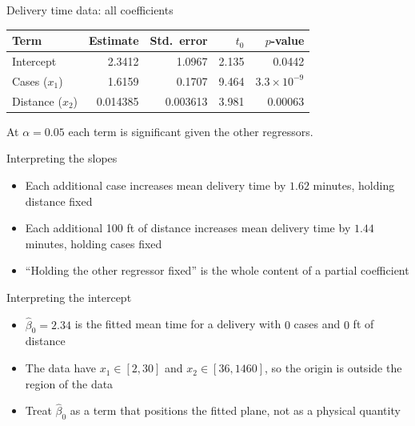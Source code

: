 \begin{frame}{Delivery time data: all coefficients}
    \begin{center}
        \begin{tabular}{lrrrr}
            \toprule
            Term & Estimate & Std.\ error & $t_0$ & $p$-value \\
            \midrule
            Intercept & 2.3412 & 1.0967 & 2.135 & 0.0442 \\
            Cases ($x_1$) & 1.6159 & 0.1707 & 9.464 & $3.3\times 10^{-9}$ \\
            Distance ($x_2$) & 0.014385 & 0.003613 & 3.981 & 0.00063 \\
            \bottomrule
        \end{tabular}
    \end{center}
    At $\alpha = 0.05$ each term is significant given the other regressors.
\end{frame}


\begin{frame}{Interpreting the slopes}
    \begin{itemize}
        \item Each additional case increases mean delivery time by $1.62$ minutes, holding distance fixed
        \item Each additional 100 ft of distance increases mean delivery time by $1.44$ minutes, holding cases fixed
        \item ``Holding the other regressor fixed'' is the whole content of a partial coefficient
    \end{itemize}
\end{frame}


\begin{frame}{Interpreting the intercept}
    \begin{itemize}
        \item $\hat\beta_0 = 2.34$ is the fitted mean time for a delivery with $0$ cases and $0$ ft of distance
        \item The data have $x_1 \in [2, 30]$ and $x_2 \in [36, 1460]$, so the origin is outside the region of the data
        \item Treat $\hat\beta_0$ as a term that positions the fitted plane, not as a physical quantity
    \end{itemize}
\end{frame}


